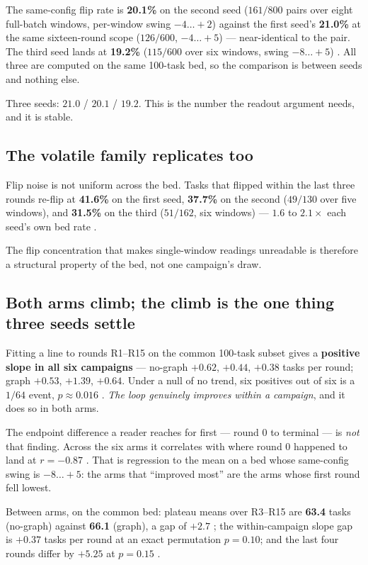 The same-config flip rate is \textbf{20.1\%} on the second seed
($161/800$ pairs over eight full-batch windows, per-window swing
$-4\ldots{+}2$) against the first seed's \textbf{21.0\%} at the same
sixteen-round scope ($126/600$, $-4\ldots{+}5$) --- near-identical to the
pair. The third seed lands at \textbf{19.2\%} ($115/600$ over six windows,
swing $-8\ldots{+}5$) . All three are computed on the
same 100-task bed, so the comparison is between seeds and nothing else.

Three seeds: $21.0$ / $20.1$ / $19.2$. This is the number the readout
argument needs, and it is stable.

\subsection*{The volatile family replicates too}

Flip noise is not uniform across the bed. Tasks that flipped within the
last three rounds re-flip at \textbf{41.6\%} on the first seed,
\textbf{37.7\%} on the second ($49/130$ over five windows), and
\textbf{31.5\%} on the third ($51/162$, six windows) --- $1.6$ to
$2.1\times$ each seed's own bed rate .

The flip concentration that makes single-window readings unreadable is
therefore a structural property of the bed, not one campaign's draw.

\subsection*{Both arms climb; the climb is the one thing three seeds
settle}
\label{sec:trend}

Fitting a line to rounds R1--R15 on the common 100-task subset gives a
\textbf{positive slope in all six campaigns} --- no-graph $+0.62$, $+0.44$,
$+0.38$ tasks per round; graph $+0.53$, $+1.39$, $+0.64$. Under a null of
no trend, six positives out of six is a $1/64$ event, $p \approx 0.016$
. \emph{The loop genuinely improves within a campaign}, and it does
so in both arms.

The endpoint difference a reader reaches for first --- round 0 to terminal
--- is \emph{not} that finding. Across the six arms it correlates with
where round 0 happened to land at $r = -0.87$ . That is regression to
the mean on a bed whose same-config swing is $-8\ldots{+}5$: the arms that
``improved most'' are the arms whose first round fell lowest.

Between arms, on the common bed: plateau means over R3--R15 are
\textbf{63.4} tasks (no-graph) against \textbf{66.1} (graph), a gap of
$+2.7$ ; the within-campaign slope gap is $+0.37$ tasks per round at
an exact permutation $p = 0.10$; and the last four rounds differ by $+5.25$
at $p = 0.15$ .

